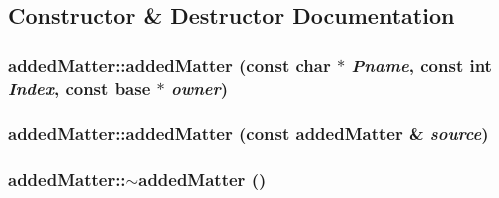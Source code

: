 \subsection{Constructor \& Destructor Documentation}
\hypertarget{classadded_matter_a97f9f5b16dfdf93ac6f751e755c631f9}{
\subsubsection[{addedMatter}]{\setlength{\rightskip}{0pt plus 5cm}addedMatter::addedMatter (const char $\ast$ {\em Pname}, \/  const int {\em Index}, \/  const {\bf base} $\ast$ {\em owner})}}
\label{classadded_matter_a97f9f5b16dfdf93ac6f751e755c631f9}
\hypertarget{classadded_matter_a9d9e11591272b620d65112841fb8502e}{
\subsubsection[{addedMatter}]{\setlength{\rightskip}{0pt plus 5cm}addedMatter::addedMatter (const {\bf addedMatter} \& {\em source})}}
\label{classadded_matter_a9d9e11591272b620d65112841fb8502e}
\hypertarget{classadded_matter_aa4b1598ba39d28c6e85f0b0a031ac180}{
\subsubsection[{$\sim$addedMatter}]{\setlength{\rightskip}{0pt plus 5cm}addedMatter::$\sim$addedMatter ()}}
\label{classadded_matter_aa4b1598ba39d28c6e85f0b0a031ac180}


